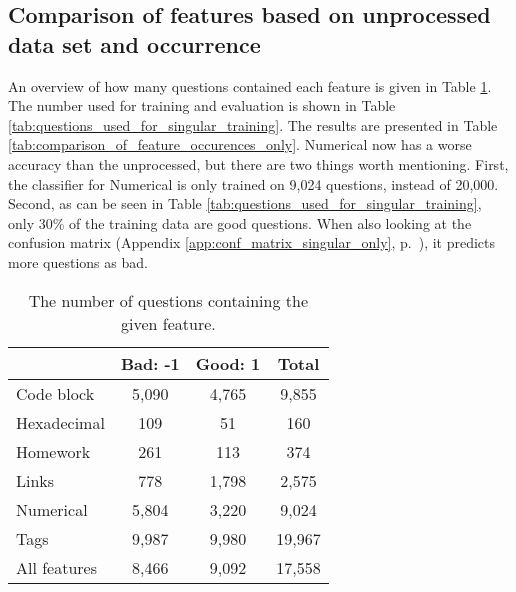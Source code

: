 \subsection{Comparison of features based on unprocessed data set and occurrence}
\label{sec:comparison_feature_occurence_unprocessed}
An overview of how many questions contained each feature is given in Table \ref{tab:amount_of_singular_questions_processed}.
The number used for training and evaluation is shown in Table \ref{tab:questions_used_for_singular_training}.
The results are presented in Table \ref{tab:comparison_of_feature_occurences_only}.
Numerical now has a worse accuracy than the unprocessed, but there are two things worth mentioning. 
First, the classifier for Numerical is only trained on 9,024 questions, instead of 20,000.
Second, as can be seen in Table \ref{tab:questions_used_for_singular_training}, only 30\% of the training data are good questions. 
When also looking at the confusion matrix (Appendix \ref{app:conf_matrix_singular_only}, p.~\pageref{app:conf_matrix_singular_only}), it predicts more questions as bad.
\begin{table}[!h]%
	\centering
	\begin{tabular}{| l | c | c | c |}
		\hline
		~ 					& Bad: -1			& Good: 1		& Total		\\ \hline
		Code block			& 5,090				& 4,765			& 9,855		\\ \hline
		Hexadecimal			& 109				& 51			& 160		\\ \hline
		Homework			& 261				& 113			& 374		\\ \hline
		Links				& 778				& 1,798			& 2,575		\\ \hline
		Numerical			& 5,804				& 3,220			& 9,024		\\ \hline
		Tags				& 9,987				& 9,980			& 19,967	\\ \hline
		All features		& 8,466				& 9,092			& 17,558	\\ \hline
	\end{tabular}
	\caption{The number of questions containing the given feature.}
	\label{tab:amount_of_singular_questions_processed}
\end{table}
